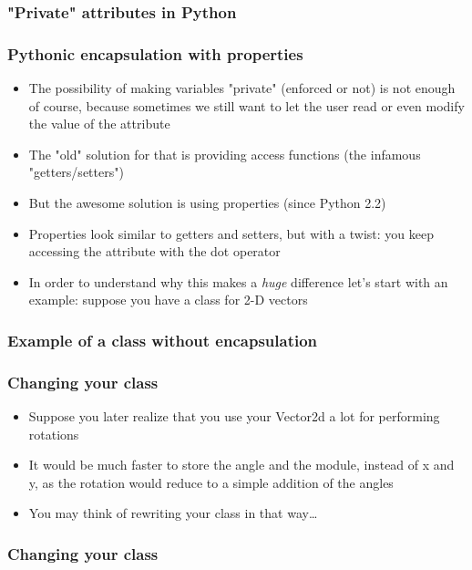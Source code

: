 \documentclass[9pt]{beamer}
\begin{document}
\begin{frame}
  \frametitle{"Private" attributes in Python}
  
\end{frame}


\begin{frame}
  \frametitle{Pythonic encapsulation with properties}

  \begin{itemize}
    \item The possibility of making variables "private" (enforced or not) is not enough of course,
          because sometimes we still want to let the user read or even modify the value of the attribute
    \medskip
    \item The "old" solution for that is providing access functions (the infamous "getters/setters")
    \medskip
    \item But the awesome solution is using \alert{properties} (since Python 2.2)
    \medskip
    \item Properties look similar to getters and setters, but with a twist: you keep
          accessing the attribute with the dot operator
    \medskip
    \item In order to understand why this makes a \emph{huge} difference let's
          start with an example: suppose you have a class for 2-D vectors
  \end{itemize}

\end{frame}

\begin{frame}
  \frametitle{Example of a class without encapsulation}
  
\end{frame}


\begin{frame}
  \frametitle{Changing your class}
  \begin{itemize}
    \item Suppose you later realize that you use your Vector2d a lot for performing rotations
    \medskip
    \item It would be much faster to store the angle and the module, instead of x and y,
          as the rotation would reduce to a simple addition of the angles
    \medskip
    \item You may think of rewriting your class in that way\dots
  \end{itemize}
\end{frame}


\begin{frame}
  \frametitle{Changing your class}
  
\end{frame}
\end{document}
